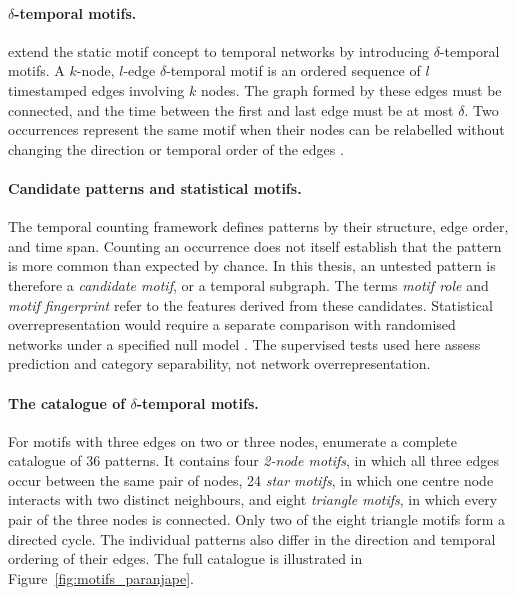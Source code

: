 \documentclass{thesisclass}
\begin{document}
\paragraph{$\delta$-temporal motifs.}
\citet{paranjape2017motifs} extend the static motif concept to temporal networks by introducing $\delta$-temporal motifs.
A $k$-node, $l$-edge $\delta$-temporal motif is an ordered sequence of
$l$ timestamped edges involving $k$ nodes. The graph formed by these edges must
be connected, and the time between the first and last edge must be at most
$\delta$. Two occurrences represent the same motif when their nodes can be
relabelled without changing the direction or temporal order of the edges
\citep{paranjape2017motifs}.

\paragraph{Candidate patterns and statistical motifs.}
The temporal counting framework defines patterns by their structure, edge order,
and time span. Counting an occurrence does not itself establish that the pattern
is more common than expected by chance. In this thesis, an untested pattern is
therefore a \emph{candidate motif}, or a temporal subgraph. The terms
\emph{motif role} and \emph{motif fingerprint} refer to the features derived from
these candidates. Statistical overrepresentation would require a separate
comparison with randomised networks under a specified null model
\citep{milo2002network}. The supervised tests used here assess prediction and
category separability, not network overrepresentation.

\paragraph{The catalogue of $\delta$-temporal motifs.}

For motifs with three edges on two or three nodes,
\citet{paranjape2017motifs} enumerate a complete catalogue of 36 patterns.
It contains four \emph{2-node motifs}, in which all three edges occur between
the same pair of nodes, 24 \emph{star motifs}, in which one centre node
interacts with two distinct neighbours, and eight \emph{triangle motifs}, in
which every pair of the three nodes is connected. Only two of the eight
triangle motifs form a directed cycle. The individual patterns also differ in
the direction and temporal ordering of their edges. The full catalogue is
illustrated in Figure~\ref{fig:motifs_paranjape}.
\end{document}
